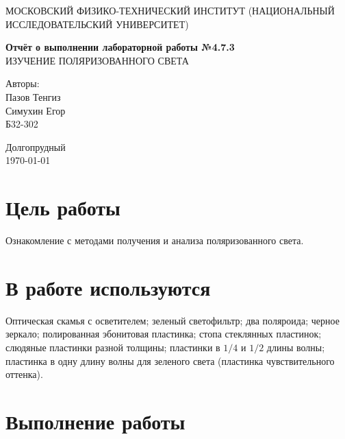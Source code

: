\documentclass[a4paper,12pt]{article} %
\date{\today}
\begin{document}
\begin{titlepage}
	\begin{center}
		{\large МОСКОВСКИЙ ФИЗИКО-ТЕХНИЧЕСКИЙ ИНСТИТУТ (НАЦИОНАЛЬНЫЙ ИССЛЕДОВАТЕЛЬСКИЙ УНИВЕРСИТЕТ)}
	\end{center}

	
	
	\vspace{6cm}
	{\huge
		\begin{center}
			{\bf Отчёт о выполнении лабораторной работы №4.7.3}\\
			ИЗУЧЕНИЕ ПОЛЯРИЗОВАННОГО СВЕТА
		\end{center}
	}
	\vspace{2cm}
	\begin{flushright}
		{\LARGE Авторы:\\ Пазов Тенгиз \\ Симухин Егор \\
			\vspace{0.2cm}
			Б32-302}
	\end{flushright}
	\vspace{8cm}
	\begin{center}
		Долгопрудный\\
		\today
	\end{center}
\end{titlepage}

\section{Цель работы}
Ознакомление с методами получения и анализа поляризованного света.

\section{В работе используются}
Оптическая скамья с осветителем; зеленый светофильтр; два поляроида; черное зеркало; полированная эбонитовая пластинка; стопа стеклянных пластинок; слюдяные пластинки разной толщины; пластинки в $ 1/4 $ и $ 1/2 $ длины волны; пластинка в одну длину волны для зеленого света (пластинка чувствительного оттенка).

\section{Выполнение работы}
\end{document}
